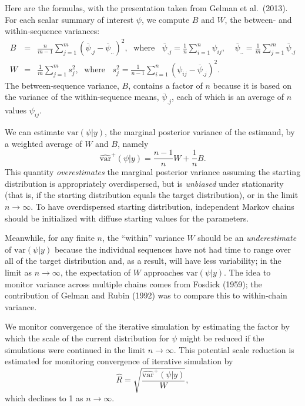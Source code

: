 \documentclass[11pt]{article}
\begin{document}
Here are the formulas, with the presentation taken from Gelman et al.\ (2013).  For each scalar summary of interest $\psi$, we compute $B$ and $W$, the between- and within-sequence variances:
\begin{eqnarray*}
B \!\!&=&\!\!
 \frac{n}{m-1}\sum_{j=1}^{m}(\overline{\psi}_{.j}-\overline{\psi}_{..})^2,
\;\mbox{ where }\;\;\overline{\psi}_{.j}=\frac{1}{n}\sum_{i=1}^n \psi_{ij},\;\;
\;\;\overline{\psi}_{..} = \frac{1}{m}\sum_{j=1}^m\overline{\psi}_{.j}\\
W \!\!&=&\!\!
 \frac{1}{m}\sum_{j=1}^{m}s_j^2, \;\mbox{ where }\;\; s_j^2=\frac{1}{n-1}
\sum_{i=1}^n (\psi_{ij}-\overline{\psi}_{.j})^2.
\end{eqnarray*}
The between-sequence variance, $B$, contains a factor of $n$ because it is based on the variance of the within-sequence means, $\overline{\psi}_{.j}$, each of which is an average of $n$ values $\psi_{ij}$.

We can estimate $\mbox{var}(\psi|y)$, the marginal posterior variance of the estimand, by a weighted average of $W$ and $B$, namely
\begin{equation}\label{hatsig}
\widehat{\mbox{var}}^+(\psi|y)=\frac{n-1}{n}W + \frac{1}{n}B.
\end{equation}
This quantity {\em overestimates}
the marginal posterior variance assuming the starting distribution
is appropriately overdispersed, but is {\em unbiased} under
stationarity (that is, if the starting distribution equals the target
distribution), or
in the limit $n\rightarrow\infty$.
To have overdispersed starting distribution, independent Markov chains
should be initialized with diffuse starting values for the parameters.

Meanwhile, for any finite $n$, the ``within'' variance
$W$ should be an {\em underestimate}
of $\mbox{var}(\psi|y)$ because the individual sequences have not had
time to range over all of the target distribution and, as a result,
will have less variability; in the limit as $n\rightarrow\infty$, the
expectation of $W$ approaches $\mbox{var}(\psi|y)$. The idea to monitor variance across multiple chains comes from Fosdick (1959); the contribution of Gelman and Rubin (1992) was to compare this to within-chain variance.


We monitor convergence of the iterative simulation by estimating
the factor by which the scale of the current distribution for $\psi$
might be reduced if the simulations were continued in the limit
$n\rightarrow\infty$.  This potential scale reduction is estimated for monitoring convergence of iterative simulation by
\begin{equation}\label{rhat.defined}
\widehat{R}=
\sqrt{\frac{\widehat{\mbox{var}}^+(\psi|y)}{W}},
\end{equation}
which declines to 1 as $n\rightarrow\infty$.
\end{document}
